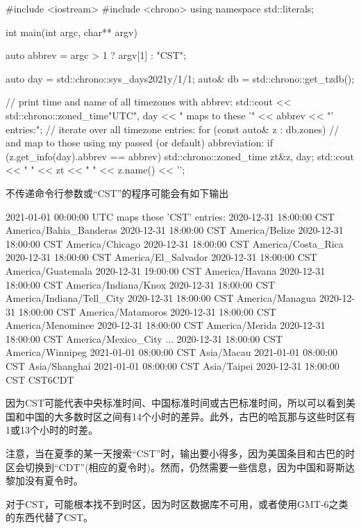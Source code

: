 \begin{cpp}
#include <iostream>
#include <chrono>
using namespace std::literals;

int main(int argc, char** argv)
{
	auto abbrev = argc > 1 ? argv[1] : "CST";

	auto day = std::chrono::sys_days{2021y/1/1};
	auto& db = std::chrono::get_tzdb();

	// print time and name of all timezones with abbrev:
	std::cout << std::chrono::zoned_time{"UTC", day}
			  << " maps to these '" << abbrev << "' entries:\n";
	// iterate over all timezone entries:
	for (const auto& z : db.zones) {
		// and map to those using my passed (or default) abbreviation:
		if (z.get_info(day).abbrev == abbrev) {
			std::chrono::zoned_time zt{&z, day};
			std::cout << " " << zt << " " << z.name() << '\n';
		}
	}
}
\end{cpp}

不传递命令行参数或“CST”的程序可能会有如下输出

\begin{shell}
2021-01-01 00:00:00 UTC maps these ’CST’ entries:
  2020-12-31 18:00:00 CST America/Bahia_Banderas
  2020-12-31 18:00:00 CST America/Belize
  2020-12-31 18:00:00 CST America/Chicago
  2020-12-31 18:00:00 CST America/Costa_Rica
  2020-12-31 18:00:00 CST America/El_Salvador
  2020-12-31 18:00:00 CST America/Guatemala
  2020-12-31 19:00:00 CST America/Havana
  2020-12-31 18:00:00 CST America/Indiana/Knox
  2020-12-31 18:00:00 CST America/Indiana/Tell_City
  2020-12-31 18:00:00 CST America/Managua
  2020-12-31 18:00:00 CST America/Matamoros
  2020-12-31 18:00:00 CST America/Menominee
  2020-12-31 18:00:00 CST America/Merida
  2020-12-31 18:00:00 CST America/Mexico_City
  ...
  2020-12-31 18:00:00 CST America/Winnipeg
  2021-01-01 08:00:00 CST Asia/Macau
  2021-01-01 08:00:00 CST Asia/Shanghai
  2021-01-01 08:00:00 CST Asia/Taipei
  2020-12-31 18:00:00 CST CST6CDT
\end{shell}

因为CST可能代表中央标准时间、中国标准时间或古巴标准时间，所以可以看到美国和中国的大多数时区之间有14个小时的差异。此外，古巴的哈瓦那与这些时区有1或13个小时的时差。

注意，当在夏季的某一天搜索“CST”时，输出要小得多，因为美国条目和古巴的时区会切换到“CDT”(相应的夏令时)。然而，仍然需要一些信息，因为中国和哥斯达黎加没有夏令时。

对于CST，可能根本找不到时区，因为时区数据库不可用，或者使用GMT-6之类的东西代替了CST。


